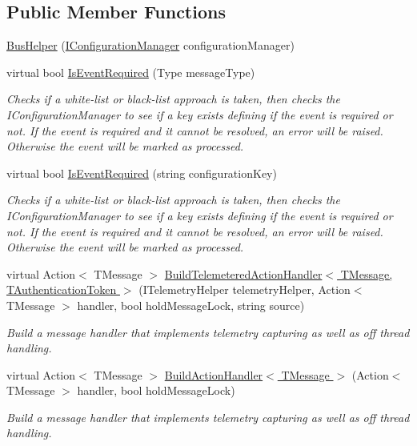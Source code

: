 \subsection*{Public Member Functions}
\begin{DoxyCompactItemize}
\item 
\hyperlink{classCqrs_1_1Bus_1_1BusHelper_a7799db8bc78bdd9ec25be5bd301d0b8a}{Bus\+Helper} (\hyperlink{interfaceCqrs_1_1Configuration_1_1IConfigurationManager}{I\+Configuration\+Manager} configuration\+Manager)
\item 
virtual bool \hyperlink{classCqrs_1_1Bus_1_1BusHelper_a28c675e976adbf348637ec6ff6410c1a}{Is\+Event\+Required} (Type message\+Type)
\begin{DoxyCompactList}\small\item\em Checks if a white-\/list or black-\/list approach is taken, then checks the I\+Configuration\+Manager to see if a key exists defining if the event is required or not. If the event is required and it cannot be resolved, an error will be raised. Otherwise the event will be marked as processed. \end{DoxyCompactList}\item 
virtual bool \hyperlink{classCqrs_1_1Bus_1_1BusHelper_a60a9603d5c6b7f29ee42491475714895}{Is\+Event\+Required} (string configuration\+Key)
\begin{DoxyCompactList}\small\item\em Checks if a white-\/list or black-\/list approach is taken, then checks the I\+Configuration\+Manager to see if a key exists defining if the event is required or not. If the event is required and it cannot be resolved, an error will be raised. Otherwise the event will be marked as processed. \end{DoxyCompactList}\item 
virtual Action$<$ T\+Message $>$ \hyperlink{classCqrs_1_1Bus_1_1BusHelper_a7edd5b2ac0d46ce225e592f857f6d525}{Build\+Telemetered\+Action\+Handler$<$ T\+Message, T\+Authentication\+Token $>$} (I\+Telemetry\+Helper telemetry\+Helper, Action$<$ T\+Message $>$ handler, bool hold\+Message\+Lock, string source)
\begin{DoxyCompactList}\small\item\em Build a message handler that implements telemetry capturing as well as off thread handling. \end{DoxyCompactList}\item 
virtual Action$<$ T\+Message $>$ \hyperlink{classCqrs_1_1Bus_1_1BusHelper_a6dc1f5166b7bcd13aa7a0d5e25ded295}{Build\+Action\+Handler$<$ T\+Message $>$} (Action$<$ T\+Message $>$ handler, bool hold\+Message\+Lock)
\begin{DoxyCompactList}\small\item\em Build a message handler that implements telemetry capturing as well as off thread handling. \end{DoxyCompactList}\end{DoxyCompactItemize}
